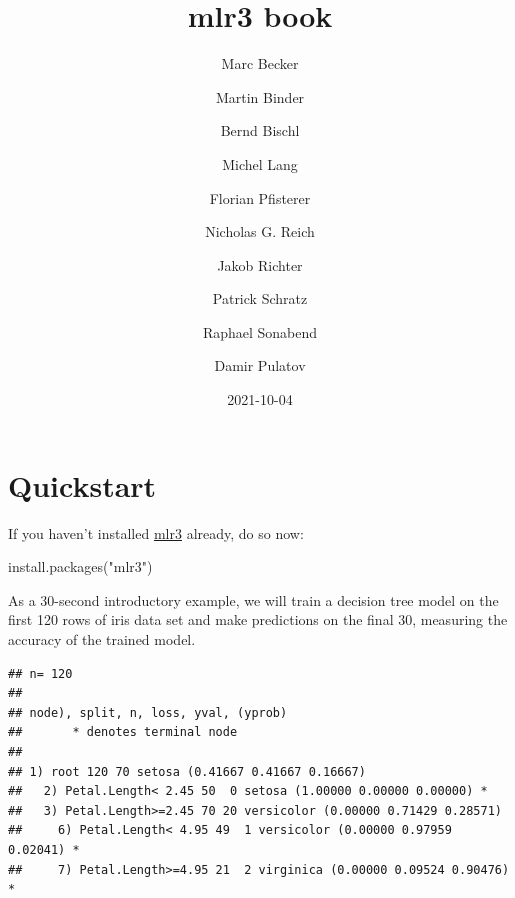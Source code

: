 \documentclass[
]{scrbook}
\title{mlr3 book}
\author{Marc Becker \and Martin Binder \and Bernd Bischl \and Michel Lang \and Florian Pfisterer \and Nicholas G. Reich \and Jakob Richter \and Patrick Schratz \and Raphael Sonabend \and Damir Pulatov}
\date{2021-10-04}
\newenvironment{Shaded}{\begin{snugshade}}{\end{snugshade}}
\newcommand{\AttributeTok}[1]{\textcolor[rgb]{0.77,0.63,0.00}{#1}}
\newcommand{\CommentTok}[1]{\textcolor[rgb]{0.56,0.35,0.01}{\textit{#1}}}
\newcommand{\DecValTok}[1]{\textcolor[rgb]{0.00,0.00,0.81}{#1}}
\newcommand{\FunctionTok}[1]{\textcolor[rgb]{0.00,0.00,0.00}{#1}}
\newcommand{\NormalTok}[1]{#1}
\newcommand{\OtherTok}[1]{\textcolor[rgb]{0.56,0.35,0.01}{#1}}
\newcommand{\SpecialCharTok}[1]{\textcolor[rgb]{0.00,0.00,0.00}{#1}}
\newcommand{\StringTok}[1]{\textcolor[rgb]{0.31,0.60,0.02}{#1}}
\renewenvironment{Shaded} {\begin{snugshade}\small} {\end{snugshade}}
\begin{document}
\maketitle

{
\hypersetup{linkcolor=}
\setcounter{tocdepth}{1}
\tableofcontents
}
\hypertarget{quickstart}{%
\chapter*{Quickstart}\label{quickstart}}

If you haven't installed \href{https://mlr3.mlr-org.com}{mlr3} already, do so now:

\begin{Shaded}
\begin{Highlighting}[]
\FunctionTok{install.packages}\NormalTok{(}\StringTok{"mlr3"}\NormalTok{)}
\end{Highlighting}
\end{Shaded}

As a 30-second introductory example, we will train a decision tree model on the first 120 rows of iris data set and make predictions on the final 30, measuring the accuracy of the trained model.

\begin{Shaded}
\end{Shaded}

\begin{verbatim}
## n= 120 
## 
## node), split, n, loss, yval, (yprob)
##       * denotes terminal node
## 
## 1) root 120 70 setosa (0.41667 0.41667 0.16667)  
##   2) Petal.Length< 2.45 50  0 setosa (1.00000 0.00000 0.00000) *
##   3) Petal.Length>=2.45 70 20 versicolor (0.00000 0.71429 0.28571)  
##     6) Petal.Length< 4.95 49  1 versicolor (0.00000 0.97959 0.02041) *
##     7) Petal.Length>=4.95 21  2 virginica (0.00000 0.09524 0.90476) *
\end{verbatim}
\end{document}
